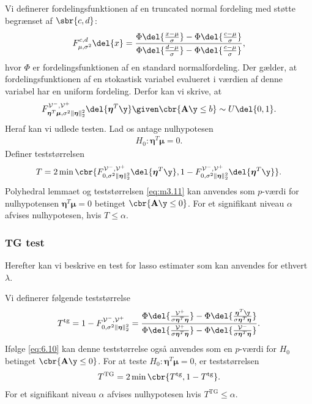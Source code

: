 Vi definerer fordelingsfunktionen af en truncated normal fordeling med støtte begrænset af \(\sbr{c,d}\):
\begin{align*}
F_{\mu, \sigma^2}^{c,d} \del{x} = \frac{\Phi\del{\frac{x-\mu}{\sigma}} - \Phi\del{\frac{c-\mu}{\sigma}}}{\Phi\del{\frac{d-\mu}{\sigma}} - \Phi\del{\frac{c-\mu}{\sigma}}},
\end{align*}
hvor \(\Phi\) er fordelingsfunktionen af en standard normalfordeling.
Der gælder, at fordelingsfunktionen af en stokastisk variabel evalueret i værdien af denne variabel har en uniform fordeling. 
Derfor kan vi skrive, at
\begin{align}
F_{\boldsymbol{\eta}^T \boldsymbol{\mu}, \sigma^2 \Vert \boldsymbol{\eta} \Vert_2^2}^{\mathcal{V}^-, \mathcal{V}^+} \del{\boldsymbol{\eta}^T \y} \given \cbr{\mathbf{A} \y \leq b} \sim U \del{0,1}. \label{eq:6.10}
\end{align}
Heraf kan vi udlede testen. 
Lad os antage nulhypotesen
\begin{align*}
H_0: \boldsymbol{\eta}^T \boldsymbol{\mu}=0.
\end{align*}
Definer teststørrelsen
\begin{align}
T=2 \min\cbr{F_{0, \sigma^2 \Vert \boldsymbol{\eta} \Vert_2^2}^{\mathcal{V}^-, \mathcal{V}^+} \del{\boldsymbol{\eta}^T \y}, 1 - F_{0, \sigma^2 \Vert \boldsymbol{\eta} \Vert_2^2}^{\mathcal{V}^-, \mathcal{V}^+} \del{\boldsymbol{\eta}^T \y}}. \label{eq:m3.11}
\end{align}
Polyhedral lemmaet og teststørrelsen \eqref{eq:m3.11} kan anvendes som \(p\)-værdi for nulhypotensen $\boldsymbol{\eta}^T \boldsymbol{\mu}=0$ betinget \(\cbr{\mathbf{A} \y \leq 0}\).
For et signifikant niveau \(\alpha\) afvises nulhypotesen, hvis $T \leq \alpha$.

\subsubsection{TG test}
Herefter kan vi beskrive en test for lasso estimater som kan anvendes for ethvert \(\lambda\).

Vi definerer følgende teststørrelse
\begin{align*}
T^{\text{tg}}=1- F_{0, \sigma^2 \Vert \boldsymbol{\eta} \Vert_2^2}^{\mathcal{V}^-, \mathcal{V}^+} = \frac{\Phi \del{\frac{\mathcal{V}^+}{\sigma  \boldsymbol{\eta}^T  \boldsymbol{\eta}}}-\Phi \del{\frac{\boldsymbol{\eta}^T \y}{\sigma  \boldsymbol{\eta}^T  \boldsymbol{\eta}}}}{\Phi \del{\frac{\mathcal{V}^+}{\sigma  \boldsymbol{\eta}^T  \boldsymbol{\eta}}}-\Phi \del{\frac{\mathcal{V}^-}{\sigma  \boldsymbol{\eta}^T  \boldsymbol{\eta}}}}.
\end{align*}
Ifølge \eqref{eq:6.10} kan denne teststørrelse også anvendes som en \(p\)-værdi for \(H_0\) betinget \(\cbr{\mathbf{A} \y \leq 0}\).
For at teste \(H_0: \boldsymbol{\eta}^T \boldsymbol{\mu}=0\), er teststørrelsen
\begin{align*}
T^{\text{TG}}= 2 \min \cbr{T^{\text{tg}}, 1-T^{\text{tg}}}.
\end{align*}
For et signifikant niveau $\alpha$ afvises nulhypotesen hvis \(T^{\text{TG}} \leq \alpha\).

